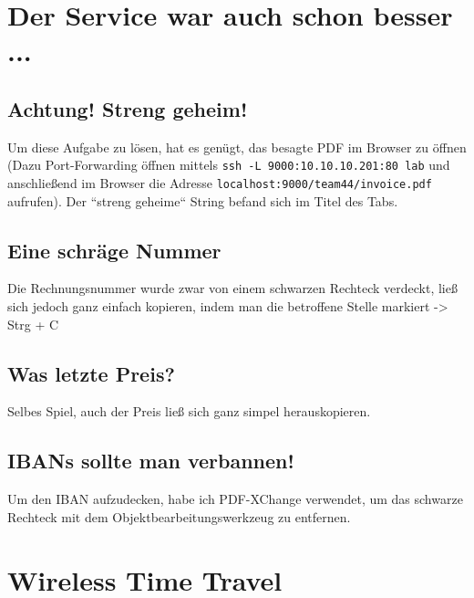 \documentclass[12pt, a4paper, titlepage, oneside]{scrartcl}
\begin{document}
	\maketitle
	\setcounter{section}{0}
	\setcounter{tocdepth}{2}
	\tableofcontents

	\newpage

	\section{Der Service war auch schon besser ...}

	\subsection{Achtung! Streng geheim!}
	Um diese Aufgabe zu l\"osen, hat es gen\"ugt, das besagte PDF im Browser zu \"offnen
	(Dazu Port-Forwarding öffnen mittels \lstinline{ssh -L 9000:10.10.10.201:80 lab}
	und anschließend im Browser die Adresse \lstinline{localhost:9000/team44/invoice.pdf}
	aufrufen). Der ``streng geheime`` String befand sich im Titel des Tabs.

	\subsection{Eine schräge Nummer}
	Die Rechnungsnummer wurde zwar von einem schwarzen Rechteck verdeckt, ließ sich
	jedoch ganz einfach kopieren, indem man die betroffene Stelle markiert -> Strg
	+ C

	\subsection{Was letzte Preis?}
	Selbes Spiel, auch der Preis ließ sich ganz simpel herauskopieren.

	\subsection{IBANs sollte man verbannen!}
	Um den IBAN aufzudecken, habe ich PDF-XChange verwendet, um das schwarze Rechteck
	mit dem Objektbearbeitungswerkzeug zu entfernen.

	\section{Wireless Time Travel}
\end{document}
